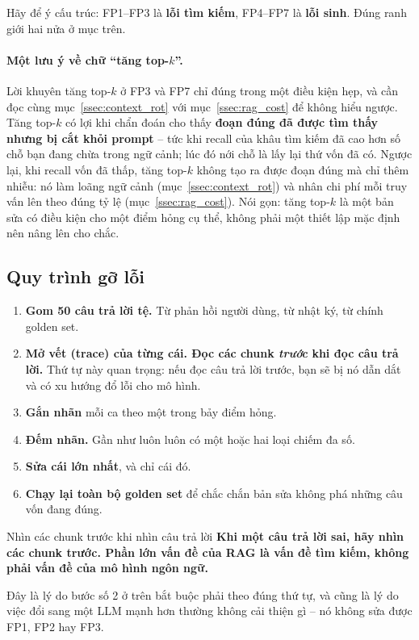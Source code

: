 \noindent Hãy để ý cấu trúc: FP1--FP3 là \textbf{lỗi tìm kiếm}, FP4--FP7 là \textbf{lỗi sinh}. Đúng ranh giới hai nửa ở mục trên.

\paragraph{Một lưu ý về chữ “tăng top-$k$”.} Lời khuyên tăng top-$k$ ở FP3 và FP7 chỉ đúng trong một điều kiện hẹp, và cần đọc cùng mục~\ref{ssec:context_rot} với mục~\ref{ssec:rag_cost} để không hiểu ngược. Tăng top-$k$ có lợi khi chẩn đoán cho thấy \textbf{đoạn đúng đã được tìm thấy nhưng bị cắt khỏi prompt} -- tức khi recall của khâu tìm kiếm đã cao hơn số chỗ bạn đang chừa trong ngữ cảnh; lúc đó nới chỗ là lấy lại thứ vốn đã có. Ngược lại, khi recall vốn đã thấp, tăng top-$k$ không tạo ra được đoạn đúng mà chỉ thêm nhiễu: nó làm loãng ngữ cảnh (mục~\ref{ssec:context_rot}) và nhân chi phí mỗi truy vấn lên theo đúng tỷ lệ (mục~\ref{ssec:rag_cost}). Nói gọn: tăng top-$k$ là một bản sửa có điều kiện cho một điểm hỏng cụ thể, không phải một thiết lập mặc định nên nâng lên cho chắc.

\subsection{Quy trình gỡ lỗi}
\label{ssec:rag_debug_routine}

\begin{enumerate}
	\item \textbf{Gom 50 câu trả lời tệ.} Từ phản hồi người dùng, từ nhật ký, từ chính golden set.
	\item \textbf{Mở vết (trace) của từng cái. Đọc các chunk \emph{trước} khi đọc câu trả lời.} Thứ tự này quan trọng: nếu đọc câu trả lời trước, bạn sẽ bị nó dẫn dắt và có xu hướng đổ lỗi cho mô hình.
	\item \textbf{Gắn nhãn} mỗi ca theo một trong bảy điểm hỏng.
	\item \textbf{Đếm nhãn.} Gần như luôn luôn có một hoặc hai loại chiếm đa số.
	\item \textbf{Sửa cái lớn nhất}, và chỉ cái đó.
	\item \textbf{Chạy lại toàn bộ golden set} để chắc chắn bản sửa không phá những câu vốn đang đúng.
\end{enumerate}

\begin{keyidea}{Nhìn các chunk trước khi nhìn câu trả lời}
\textbf{Khi một câu trả lời sai, hãy nhìn các chunk trước. Phần lớn vấn đề của RAG là vấn đề tìm kiếm, không phải vấn đề của mô hình ngôn ngữ.}

Đây là lý do bước số 2 ở trên bắt buộc phải theo đúng thứ tự, và cũng là lý do việc đổi sang một LLM mạnh hơn thường không cải thiện gì -- nó không sửa được FP1, FP2 hay FP3.
\end{keyidea}


